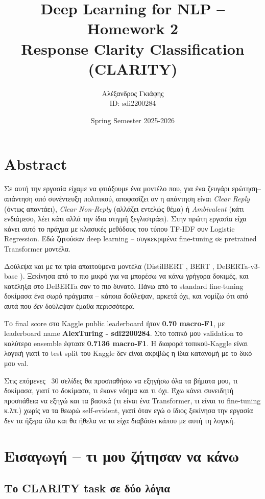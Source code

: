 \documentclass[12pt]{fphw}
\title{Deep Learning for NLP -- Homework 2 \\ Response Clarity Classification (CLARITY)}
\author{Αλέξανδρος Γκιάφης \\ ID: sdi2200284}
\date{Spring Semester 2025-2026}
\institute{National and Kapodistrian University of Athens \\ Department of Informatics and Telecommunications}
\begin{document}
\maketitle

{
  \hypersetup{linkcolor=black}
  \tableofcontents
}
\newpage

\section{Abstract}

Σε αυτή την εργασία είχαμε να φτιάξουμε ένα μοντέλο που, για ένα ζευγάρι ερώτηση--απάντηση από συνέντευξη πολιτικού, αποφασίζει αν η απάντηση είναι \emph{Clear Reply} (όντως απαντάει), \emph{Clear Non-Reply} (αλλάζει εντελώς θέμα) ή \emph{Ambivalent} (κάτι ενδιάμεσο, λέει κάτι αλλά την ίδια στιγμή ξεγλιστράει). Στην πρώτη εργασία είχα κάνει αυτό το πράγμα με κλασικές μεθόδους του τύπου TF-IDF συν Logistic Regression. Εδώ ζητούσαν deep learning -- συγκεκριμένα fine-tuning σε pretrained Transformer μοντέλα.

Δούλεψα και με τα τρία απαιτούμενα μοντέλα (DistilBERT \cite{sanh2019distilbert}, BERT \cite{devlin2019bert}, DeBERTa-v3-base \cite{he2021deberta}). Ξεκίνησα από το πιο μικρό για να μπορέσω να κάνω γρήγορα δοκιμές, και κατέληξα στο DeBERTa σαν το πιο δυνατό. Πάνω από το standard fine-tuning δοκίμασα ένα σωρό πράγματα -- κάποια δούλεψαν, αρκετά όχι, και νομίζω ότι από αυτά που \emph{δεν} δούλεψαν έμαθα περισσότερα.

Το final score στο Kaggle public leaderboard ήταν \textbf{0.70 macro-F1}, με leaderboard name \textbf{AlexTuring - sdi2200284}. Στο τοπικό μου validation το καλύτερο ensemble έφτασε \textbf{0.7136 macro-F1}. Η διαφορά τοπικού-Kaggle είναι λογική γιατί το test split του Kaggle δεν είναι ακριβώς η ίδια κατανομή με το δικό μου val.

Στις επόμενες ~30 σελίδες θα προσπαθήσω να εξηγήσω όλα τα βήματα μου, τι δοκίμασα, γιατί το δοκίμασα, τι έκανε νόημα και τι όχι. Έχω κάνει συνειδητή προσπάθεια να εξηγώ και τα βασικά (τι είναι ένα Transformer, τι είναι το fine-tuning κ.λπ.) χωρίς να τα θεωρώ self-evident, γιατί όταν εγώ ο ίδιος ξεκίνησα την εργασία δεν τα ήξερα όλα και θα ήθελα να τα είχα διαβάσει κάπου με αυτή τη λογική.

\section{Εισαγωγή -- τι μου ζήτησαν να κάνω}

\subsection{Το CLARITY task σε δύο λόγια}
\end{document}
